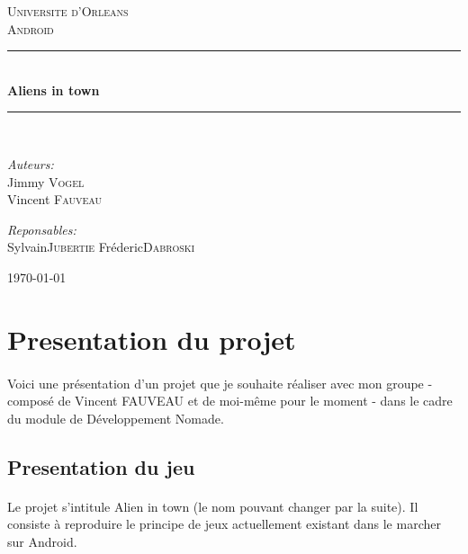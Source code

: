 \documentclass[pdftex,12pt,a4paper]{report}
\newcommand{\HRule} {\rule{\linewidth} {0.5mm}}
\begin{document}
\begin{titlepage}
	\begin{center}
		\textsc{\LARGE Universite d'Orleans }\\[1.5cm]
		\textsc{\LARGE Android}\\[0.5cm]

		\HRule \\[0.4cm]
		{\huge \bfseries Aliens in town}\\[0.3cm]
		\HRule \\[1.5cm]

		\begin{minipage}{0.4\textwidth}
 			\begin{flushleft} \large
  				\emph{Auteurs:}\\
  				Jimmy \textsc{Vogel}\\
  				Vincent \textsc{Fauveau}
			\end{flushleft}
		\end{minipage}
		\begin{minipage}{0.4\textwidth}
 			\begin{flushright}\large
 				\emph{Reponsables:}\\
 				Sylvain\textsc{Jubertie}
 				Fréderic\textsc{Dabroski}
 			\end{flushright}
		\end{minipage}
		\vfill
		{\large \today}
	\end{center}
\end{titlepage}

\section{Presentation du projet}

\paragraph{}
Voici une présentation d'un projet que je souhaite réaliser avec mon groupe - composé de Vincent FAUVEAU et de moi-même pour le moment - dans le cadre du module de  Développement Nomade.

\subsection{Presentation du jeu}
\paragraph{}
\textnormal{Le projet s'intitule Alien in town (le nom pouvant changer par la suite).}
\textnormal{Il consiste à reproduire le principe de jeux actuellement existant dans le marcher sur Android. }
\end{document}
